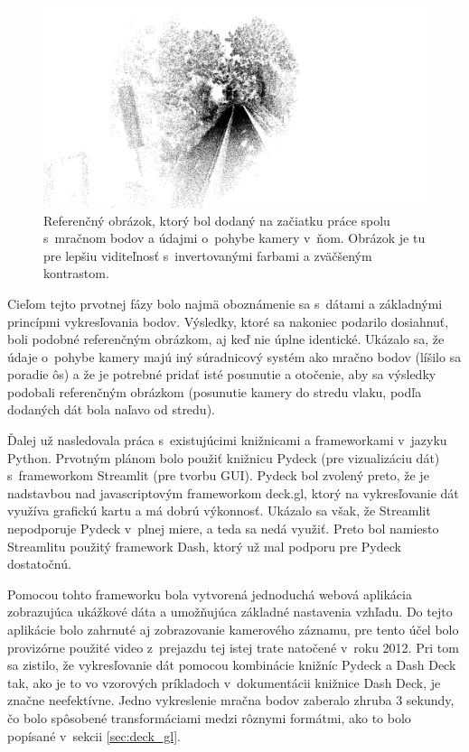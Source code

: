 \begin{figure}[h]
    \centering
    \includegraphics[width=0.95\linewidth]{obrazky-figures/referencny_obrazok.png}
    \caption{Referenčný obrázok, ktorý bol dodaný na začiatku práce spolu s~mračnom bodov a údajmi o~pohybe kamery v~ňom. Obrázok je tu pre lepšiu viditeľnosť s~invertovanými farbami a zväčšeným kontrastom.}
    \label{fig:referencny-obrazok}
\end{figure}

Cieľom tejto prvotnej fázy bolo najmä oboznámenie sa s~dátami a základnými princípmi vykresľovania bodov. Výsledky, ktoré sa nakoniec podarilo dosiahnuť, boli podobné referenčným obrázkom, aj keď nie úplne identické. Ukázalo sa, že údaje o~pohybe kamery majú iný súradnicový systém ako mračno bodov (líšilo sa poradie ôs) a že je potrebné pridať isté posunutie a otočenie, aby sa výsledky podobali referenčným obrázkom (posunutie kamery do stredu vlaku, podľa dodaných dát bola naľavo od stredu).

Ďalej už nasledovala práca s~existujúcimi knižnicami a frameworkami v~jazyku Python. Prvotným plánom bolo použiť knižnicu Pydeck (pre vizualizáciu dát) s~frameworkom Streamlit (pre tvorbu GUI). Pydeck bol zvolený preto, že je nadstavbou nad javascriptovým frameworkom deck.gl, ktorý na vykresľovanie dát využíva grafickú kartu a má dobrú výkonnosť. Ukázalo sa však, že Streamlit nepodporuje Pydeck v~plnej miere, a teda sa nedá využiť. Preto bol namiesto Streamlitu použitý framework Dash, ktorý už mal podporu pre Pydeck dostatočnú.

Pomocou tohto frameworku bola vytvorená jednoduchá webová aplikácia zobrazujúca ukážkové dáta a umožňujúca základné nastavenia vzhľadu. Do tejto aplikácie bolo zahrnuté aj zobrazovanie kamerového záznamu, pre tento účel bolo provizórne použité video z~prejazdu tej istej trate natočené v~roku 2012. Pri tom sa zistilo, že vykresľovanie dát pomocou kombinácie knižníc Pydeck a Dash Deck tak, ako je to vo vzorových príkladoch v~dokumentácii knižnice Dash Deck, je značne neefektívne. Jedno vykreslenie mračna bodov zaberalo zhruba 3 sekundy, čo bolo spôsobené transformáciami medzi rôznymi formátmi, ako to bolo popísané v~sekcii \ref{sec:deck_gl}.

